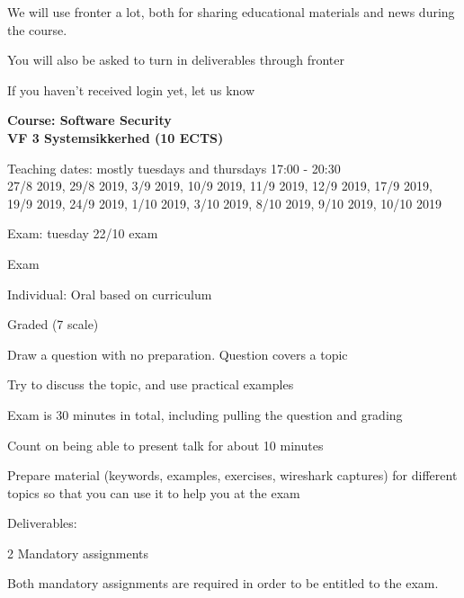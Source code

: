 \documentclass[Screen16to9,17pt]{foils}
\begin{document}


We will use fronter a lot, both for sharing educational materials and news during the course.

You will also be asked to turn in deliverables through fronter


\vskip 5mm
\centerline{If you haven't received login yet, let us know}





{\Large\bf Course: Software Security\\
VF 3 Systemsikkerhed (10 ECTS)}

Teaching dates: mostly tuesdays and thursdays 17:00 - 20:30\\
27/8 2019, 29/8 2019, 3/9 2019, 10/9 2019, 11/9 2019, 12/9 2019, 17/9 2019, 19/9 2019, 24/9 2019, 1/10 2019, 3/10 2019, 8/10 2019, 9/10 2019, 10/10 2019

Exam: tuesday 22/10 exam


\begin{list2}
\item Exam
\item Individual: Oral based on curriculum
\item Graded (7 scale)
\item Draw a question with no preparation. Question covers a topic
\item Try to discuss the topic, and use practical examples
\item Exam is 30 minutes in total, including pulling the question and grading
\item Count on being able to present talk for about 10 minutes
\item Prepare material (keywords, examples, exercises, wireshark captures) for different topics so that you can use it to help you at the exam

\vskip 5mm
\item Deliverables:
\item 2 Mandatory assignments
\item Both mandatory assignments are required in order to be entitled to the exam.
\end{list2}
\end{document}
